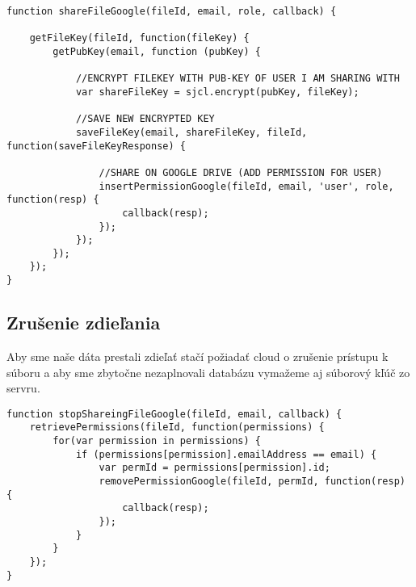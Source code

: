 \begin{lstlisting}[caption=Zdieľanie súboru]	
function shareFileGoogle(fileId, email, role, callback) {

    getFileKey(fileId, function(fileKey) {
        getPubKey(email, function (pubKey) {

            //ENCRYPT FILEKEY WITH PUB-KEY OF USER I AM SHARING WITH
            var shareFileKey = sjcl.encrypt(pubKey, fileKey);

            //SAVE NEW ENCRYPTED KEY
            saveFileKey(email, shareFileKey, fileId, function(saveFileKeyResponse) {

                //SHARE ON GOOGLE DRIVE (ADD PERMISSION FOR USER)
                insertPermissionGoogle(fileId, email, 'user', role, function(resp) {
                    callback(resp);
                });
            });
        });
    });
}
\end{lstlisting}		
	
	\subsection{Zrušenie zdieľania}
	
		Aby sme naše dáta prestali zdieľať stačí požiadať cloud o zrušenie prístupu k súboru a aby sme zbytočne nezaplnovali databázu vymažeme aj súborový kľúč zo servru. 
	
\begin{lstlisting}[caption=Zrušenie zdieľanie súboru]		
function stopShareingFileGoogle(fileId, email, callback) {
    retrievePermissions(fileId, function(permissions) {
        for(var permission in permissions) {
            if (permissions[permission].emailAddress == email) {
                var permId = permissions[permission].id;
                removePermissionGoogle(fileId, permId, function(resp) {
                    callback(resp);
                });
            }
        }
    });
}
\end{lstlisting}	